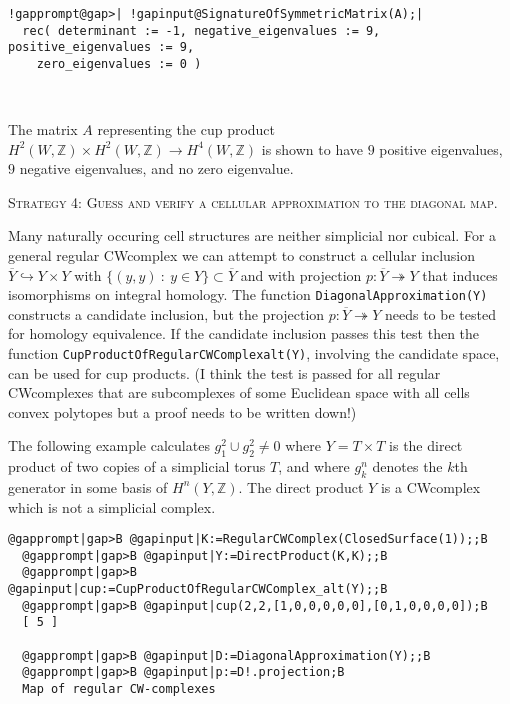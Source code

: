 \documentclass[a4paper,11pt]{report}
\begin{document}
{{\begin{Verbatim}[commandchars=!@|,fontsize=\small,frame=single,label=Example]
  !gapprompt@gap>| !gapinput@SignatureOfSymmetricMatrix(A);|
  rec( determinant := -1, negative_eigenvalues := 9, positive_eigenvalues := 9,
    zero_eigenvalues := 0 )
  
  
\end{Verbatim}
 The matrix $A$ representing the cup product $H^2(W,\mathbb Z)\times H^2(W,\mathbb Z) \rightarrow H^4(W,\mathbb Z)$ is shown to have $9$ positive eigenvalues, $9$ negative eigenvalues, and no zero eigenvalue. 

\textsc{Strategy 4: Guess and verify a cellular approximation to the diagonal map.} 

Many naturally occuring cell structures are neither simplicial nor cubical.
For a general regular CW\texttt{}complex we can attempt to
construct a cellular inclusion $\overline Y \hookrightarrow Y\times Y$ with $\{(y,y)\ :\ y\in Y\}\subset \overline Y$ and with projection $p\colon \overline Y \twoheadrightarrow Y$ that induces isomorphisms on integral homology. The function \texttt{DiagonalApproximation(Y)} constructs a candidate inclusion, but the projection $p\colon \overline Y \twoheadrightarrow Y$ needs to be tested for homology equivalence. If the candidate inclusion passes
this test then the function \texttt{CupProductOfRegularCWComplex{\textunderscore}alt(Y)}, involving the candidate space, can be used for cup products. (I think the
test is passed for all regular CW\texttt{}complexes that are
subcomplexes of some Euclidean space with all cells convex polytopes
\texttt{}\texttt{} but a proof needs to be written
down!) 

The following example calculates $g_1^2 \cup g_2^2 \ne 0$ where $Y=T\times T$ is the direct product of two copies of a simplicial torus $T$, and where $g_k^n$ denotes the $k$\texttt{}th generator in some basis of $H^n(Y,\mathbb Z)$. The direct product $Y$ is a CW\texttt{}complex which is not a simplicial complex. 
\begin{Verbatim}[commandchars=@|B,fontsize=\small,frame=single,label=Example]
  @gapprompt|gap>B @gapinput|K:=RegularCWComplex(ClosedSurface(1));;B
  @gapprompt|gap>B @gapinput|Y:=DirectProduct(K,K);;B
  @gapprompt|gap>B @gapinput|cup:=CupProductOfRegularCWComplex_alt(Y);;B
  @gapprompt|gap>B @gapinput|cup(2,2,[1,0,0,0,0,0],[0,1,0,0,0,0]);B
  [ 5 ]
  
  @gapprompt|gap>B @gapinput|D:=DiagonalApproximation(Y);;B
  @gapprompt|gap>B @gapinput|p:=D!.projection;B
  Map of regular CW-complexes
  

\end{Verbatim}}}
\end{document}

